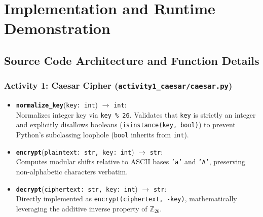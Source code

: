 \documentclass[12pt,a4paper]{report}
\begin{document}
\clearpage

\chapter{Implementation and Runtime Demonstration}

\section{Source Code Architecture and Function Details}
\subsection{Activity 1: Caesar Cipher (\texttt{activity1\_caesar/caesar.py})}
\begin{itemize}[leftmargin=1.5em]
    \item \textbf{\texttt{normalize\_key}}(\texttt{key: int}) $\to$ \texttt{int}:\\[2pt]
    Normalizes integer key via \texttt{key \% 26}. Validates that \texttt{key} is strictly an integer and explicitly disallows booleans (\texttt{isinstance(key, bool)}) to prevent Python's subclassing loophole (\texttt{bool} inherits from \texttt{int}).
    \item \textbf{\texttt{encrypt}}(\texttt{plaintext: str, key: int}) $\to$ \texttt{str}:\\[2pt]
    Computes modular shifts relative to ASCII bases \texttt{'a'} and \texttt{'A'}, preserving non-alphabetic characters verbatim.
    \item \textbf{\texttt{decrypt}}(\texttt{ciphertext: str, key: int}) $\to$ \texttt{str}:\\[2pt]
    Directly implemented as \texttt{encrypt(ciphertext, -key)}, mathematically leveraging the additive inverse property of $\mathbb{Z}_{26}$.
\end{itemize}
\end{document}
